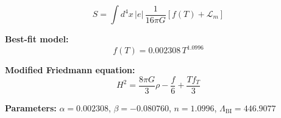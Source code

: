 
\begin{equation}
  S = \int d^4x \, |e| \, \frac{1}{16\pi G} \left[ f(T) + \mathcal{L}_m \right]
\end{equation}

\textbf{Best-fit model:}
\begin{equation}
  f(T) = 0.002308 \, T^{1.0996}
\end{equation}

\textbf{Modified Friedmann equation:}
\begin{equation}
  H^2 = \frac{8\pi G}{3} \rho - \frac{f}{6} + \frac{T f_T}{3}
\end{equation}

\textbf{Parameters:}
$\alpha = 0.002308$, \quad
$\beta = -0.080760$, \quad
$n = 1.0996$, \quad
$\Lambda_{\text{BI}} = 446.9077$